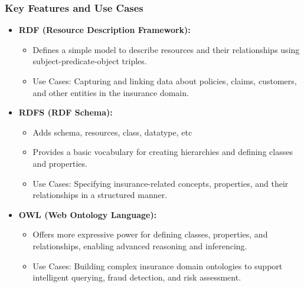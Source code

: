 \begin{frame}[fragile]
\frametitle{Key Features and Use Cases}
\begin{itemize}
\item \textbf{RDF (Resource Description Framework):}
\begin{itemize}
\item Defines a simple model to describe resources and their relationships using subject-predicate-object triples.
\item Use Cases: Capturing and linking data about policies, claims, customers, and other entities in the insurance domain.
\end{itemize}

\item \textbf{RDFS (RDF Schema):}
\begin{itemize}
\item Adds schema, resources, class, datatype, etc
\item Provides a basic vocabulary for creating hierarchies and defining classes and properties.
\item Use Cases: Specifying insurance-related concepts, properties, and their relationships in a structured manner.
\end{itemize}

\item \textbf{OWL (Web Ontology Language):}
\begin{itemize}
\item Offers more expressive power for defining classes, properties, and relationships, enabling advanced reasoning and inferencing.
\item Use Cases: Building complex insurance domain ontologies to support intelligent querying, fraud detection, and risk assessment.
\end{itemize}
\end{itemize}
\end{frame}


